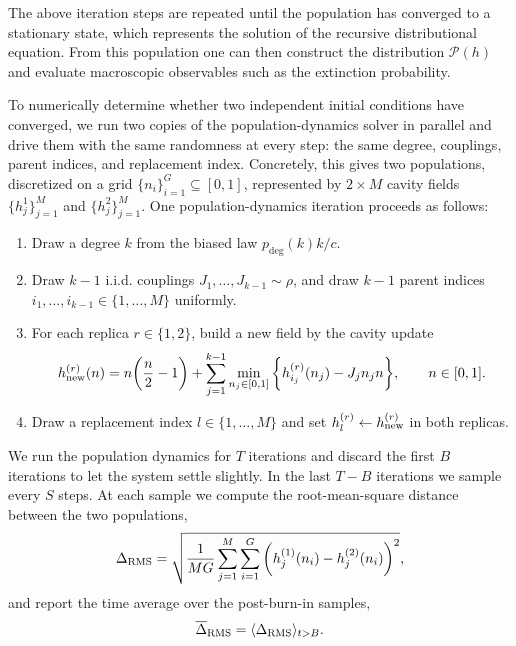 \documentclass[11pt,a4paper]{article}
\begin{document}
The above iteration steps are repeated until the population has converged to a stationary state, which represents the solution of the recursive distributional equation. From this population one can then construct the distribution $\mathcal{P}(h)$ and evaluate macroscopic observables such as the extinction probability.

To numerically determine whether two independent initial conditions have converged, we run two copies of the population-dynamics solver in parallel and drive them with the same randomness at every step: the same degree, couplings, parent indices, and replacement index.
Concretely, this gives two populations, discretized on a grid $\{n_i\}_{i=1}^{G} \subseteq [0,1]$, represented by $2 \times M$ cavity fields $\{ h_j^{1} \}_{j=1}^{M}$ and $\{ h_j^{2} \}_{j=1}^{M}$. One population-dynamics iteration proceeds as follows:
\begin{enumerate}
    \item Draw a degree $k$ from the biased law $p_{\text{deg}}(k) k /c$.
    \item Draw $k-1$ i.i.d. couplings $J_1, \dots, J_{k-1} \sim \rho$, and draw $k-1$ parent indices $i_1, \dots, i_{k-1} \in \{1, \dots, M \}$ uniformly.
    \item For each replica $r \in \{1,2\}$, build a new field by the cavity update
    \begin{align*}
        h_{\rm new}^{(r)}(n) = n\bigg( \frac{n}{2}-1 \bigg) + \sum_{j=1}^{k-1} \min_{n_j \in [0,1]} \bigg\{ h_{i_j}^{(r)}(n_j) - J_j n_j n \bigg\}, \qquad n \in [0,1].
    \end{align*}
    \item Draw a replacement index $l \in \{1, \dots, M\}$ and set $h_l^{(r)} \leftarrow h_{\rm new}^{(r)}$ in both replicas.
\end{enumerate}
We run the population dynamics for $T$ iterations and discard the first $B$ iterations to let the system settle slightly. In the last $T-B$ iterations we sample every $S$ steps. At each sample we compute the root-mean-square distance between the two populations,
\begin{align}
    \Delta_{\rm RMS} = \sqrt{ \frac{1}{MG} \sum_{j=1}^{M} \sum_{i=1}^{G} \bigg( h_{j}^{(1)}(n_i) - h_{j}^{(2)}(n_i) \bigg)^2 },
\end{align}
and report the time average over the post-burn-in samples,
\begin{align}
    \overline{\Delta}_{\rm RMS} = \langle \Delta_{\rm RMS} \rangle_{t > B}.
\end{align}
\end{document}

